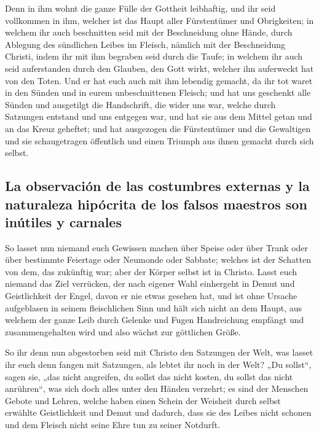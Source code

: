  Denn in ihm wohnt die ganze Fülle der Gottheit
leibhaftig,  und ihr seid vollkommen in ihm, welcher ist
das Haupt aller Fürstentümer und Obrigkeiten;  in welchem
ihr auch beschnitten seid mit der Beschneidung ohne Hände, durch
Ablegung des sündlichen Leibes im Fleisch, nämlich mit der Beschneidung
Christi,  indem ihr mit ihm begraben seid durch die
Taufe; in welchem ihr auch seid auferstanden durch den Glauben, den Gott
wirkt, welcher ihn auferweckt hat von den Toten.  Und er
hat euch auch mit ihm lebendig gemacht, da ihr tot waret in den Sünden
und in eurem unbeschnittenen Fleisch; und hat uns geschenkt alle Sünden
 und ausgetilgt die Handschrift, die wider uns war,
welche durch Satzungen entstand und uns entgegen war, und hat sie aus
dem Mittel getan und an das Kreuz geheftet;  und hat
ausgezogen die Fürstentümer und die Gewaltigen und sie schaugetragen
öffentlich und einen Triumph aus ihnen gemacht durch sich selbst.

\hypertarget{la-observaciuxf3n-de-las-costumbres-externas-y-la-naturaleza-hipuxf3crita-de-los-falsos-maestros-son-inuxfatiles-y-carnales}{%
\subsection{La observación de las costumbres externas y la naturaleza
hipócrita de los falsos maestros son inútiles y
carnales}\label{la-observaciuxf3n-de-las-costumbres-externas-y-la-naturaleza-hipuxf3crita-de-los-falsos-maestros-son-inuxfatiles-y-carnales}}

 So lasset nun niemand euch Gewissen machen über Speise
oder über Trank oder über bestimmte Feiertage oder Neumonde oder
Sabbate;  welches ist der Schatten von dem, das zukünftig
war; aber der Körper selbst ist in Christo.  Lasst euch
niemand das Ziel verrücken, der nach eigener Wahl einhergeht in Demut
und Geistlichkeit der Engel, davon er nie etwas gesehen hat, und ist
ohne Ursache aufgeblasen in seinem fleischlichen Sinn 
und hält sich nicht an dem Haupt, aus welchem der ganze Leib durch
Gelenke und Fugen Handreichung empfängt und zusammengehalten wird und
also wächst zur göttlichen Größe.

 So ihr denn nun abgestorben seid mit Christo den
Satzungen der Welt, was lasset ihr euch denn fangen mit Satzungen, als
lebtet ihr noch in der Welt?  „Du sollst``, sagen sie,
„das nicht angreifen, du sollst das nicht kosten, du sollst das nicht
anrühren``,  was sich doch alles unter den Händen
verzehrt; es sind der Menschen Gebote und Lehren,  welche
haben einen Schein der Weisheit durch selbst erwählte Geistlichkeit und
Demut und dadurch, dass sie des Leibes nicht schonen und dem Fleisch
nicht seine Ehre tun zu seiner Notdurft.

